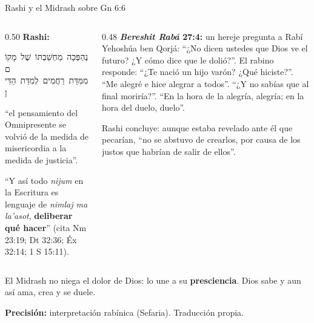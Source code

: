 \documentclass[hyperref={bookmarks=false},aspectratio=169]{beamer}
\newcommand{\heb}[1]{\mbox{\foreignlanguage{hebrew}{#1}}}
\newcommand{\destacar}[1]{\textbf{\textcolor{azul}{#1}}}
\newcommand{\precision}[1]{{\footnotesize\color{gris}\textbf{Precisión:} #1}}
\begin{document}
\begin{frame}{Rashi y el Midrash sobre Gn 6:6}
\begin{columns}[t,onlytextwidth]
\begin{column}{0.50\textwidth}\scriptsize
\textbf{Rashi:}\par\begin{center}\heb{נֶהְפְּכָה מַחְשַׁבְתּוֹ שֶׁל מָקוֹם}\\ \heb{מִמִּדַּת רַחֲמִים לְמִדַּת הַדִּין}\end{center}``el pensamiento del Omnipresente se volvió de la medida de misericordia a la medida de justicia''.\par\smallskip
``Y así todo \emph{nijum} en la Escritura es lenguaje de \emph{nimlaj ma la'asot}, \destacar{deliberar qué hacer}'' (cita Nm 23:19; Dt 32:36; Éx 32:14; 1 S 15:11).
\end{column}
\begin{column}{0.48\textwidth}\scriptsize
\textbf{\emph{Bereshit Rabá} 27:4:} un hereje pregunta a Rabí Yehoshúa ben Qorjá: ``¿No dicen ustedes que Dios ve el futuro? ¿Y cómo dice que le dolió?''. El rabino responde: ``¿Te nació un hijo varón? ¿Qué hiciste?''. ``Me alegré e hice alegrar a todos''. ``¿Y no sabías que al final moriría?''. ``En la hora de la alegría, alegría; en la hora del duelo, duelo''.\par\smallskip
Rashi concluye: aunque estaba revelado ante él que pecarían, ``no se abstuvo de crearlos, por causa de los justos que habrían de salir de ellos''.
\end{column}
\end{columns}\par\medskip
\small\RaggedRight El Midrash no niega el dolor de Dios: lo une a su \destacar{presciencia}. Dios sabe y aun así ama, crea y se duele.\par\smallskip
\precision{interpretación rabínica (Sefaria). Traducción propia.}
\end{frame}
\end{document}
